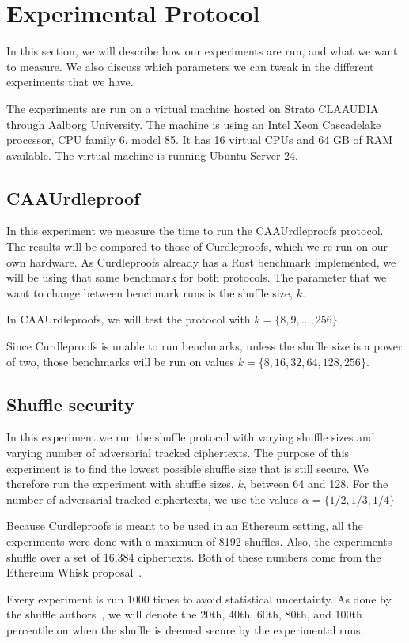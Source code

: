 
\section{Experimental Protocol}\label{sec:experimental-protocol}
In this section, we will describe how our experiments are run, and what we want to measure.
We also discuss which parameters we can tweak in the different experiments that we have.

The experiments are run on a virtual machine hosted on Strato CLAAUDIA through Aalborg University.
The machine is using an Intel Xeon Cascadelake processor, CPU family 6, model 85.
It has 16 virtual CPUs and 64 GB of RAM available.
The virtual machine is running Ubuntu Server 24.


\subsection{CAAUrdleproof}\label{sec:CAAUrdleproof-experiment}
In this experiment we measure the time to run the CAAUrdleproofs protocol.
The results will be compared to those of Curdleproofs, which we re-run on our own hardware.
As Curdleproofs already has a Rust benchmark implemented, we will be using that same benchmark for both protocols.
The parameter that we want to change between benchmark runs is the shuffle size, $k$.

In CAAUrdleproofs, we will test the protocol with $k=\{8,9,\dots,256\}$.

Since Curdleproofs is unable to run benchmarks, unless the shuffle size is a power of two, those benchmarks will be run on values $k=\{8,16,32,64,128,256\}$.




\subsection{Shuffle security}\label{subsec:experimental-protocol-shuffle-security}
In this experiment we run the shuffle protocol with varying shuffle sizes and varying number of adversarial tracked ciphertexts.
The purpose of this experiment is to find the lowest possible shuffle size that is still secure.
We therefore run the experiment with shuffle sizes, $k$, between 64 and 128.
For the number of adversarial tracked ciphertexts, we use the values $\alpha=\{1/2,1/3,1/4\}$

Because Curdleproofs is meant to be used in an Ethereum setting, all the experiments were done with a maximum of 8192 shuffles.
Also, the experiments shuffle over a set of 16,384 ciphertexts.
Both of these numbers come from the Ethereum Whisk proposal~\cite{Whisk2024}.


Every experiment is run 1000 times to avoid statistical uncertainty.
As done by the shuffle authors~\cite{cryptoeprint:2022/560}, we will denote the 20th, 40th, 60th, 80th, and 100th percentile on when the shuffle is deemed secure by the experimental runs.

